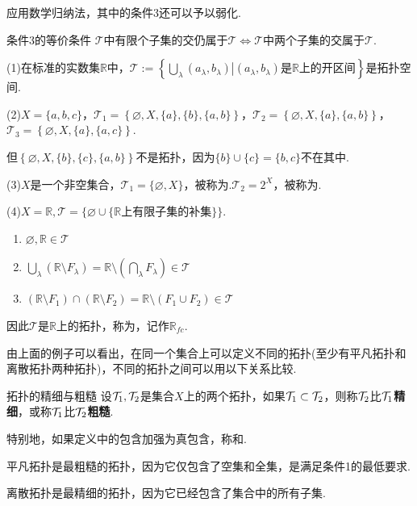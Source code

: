 应用数学归纳法，其中的条件3还可以予以弱化.
\begin{proposition}{条件3的等价条件}
    $\mathcal{T}$中有限个子集的交仍属于$\mathcal{T} \Leftrightarrow \mathcal{T}$中两个子集的交属于$\mathcal{T}$.
\end{proposition}

\begin{instance}
    (1)在标准的实数集$\mathbb{R}$中，$\mathcal{T}:=\left\{\bigcup_\lambda{(a_\lambda,b_\lambda)}\left|(a_\lambda,b_\lambda)\text{是}\mathbb{R}\text{上的开区间}\right.\right\}$是拓扑空间.\par
    (2)$X=\{a,b,c\}$，$\mathcal{T}_1 = \left\{\varnothing,X,\{a\},\{b\},\{a,b\}\right\}$，$\mathcal{T}_2 = \left\{\varnothing,X,\{a\},\{a,b\}\right\}$，$\mathcal{T}_3 = \left\{\varnothing,X,\{a\},\{a,c\}\right\}$.\par
    但$\left\{\varnothing,X,\{b\},\{c\},\{a,b\}\right\}$不是拓扑，因为$\{b\}\cup\{c\}=\{b,c\}$不在其中.\par
    (3)$X$是一个非空集合，$\mathcal{T}_1=\{\varnothing,X\}$，被称为.$\mathcal{T}_2=2^X$，被称为.\par
    (4)$X=\mathbb{R},\mathcal{T}=\{\varnothing\cup\{\mathbb{R}\text{上有限子集的补集}\}\}$.
    \begin{enumerate}[leftmargin=4.75em,label=(\roman*)]
        \item $\varnothing,\mathbb{R} \in \mathcal{T}$
        \item $\bigcup_{\lambda}{\left(\mathbb{R}\setminus F_\lambda\right)}=\mathbb{R}\setminus\left(\bigcap_{\lambda}{F_\lambda}\right) \in \mathcal{T}$
        \item $(\mathbb{R}\setminus F_1) \cap (\mathbb{R}\setminus F_2)=\mathbb{R}\setminus\left(F_1\cup F_2\right) \in \mathcal{T}$
    \end{enumerate}
    因此$\mathcal{T}$是$\mathbb{R}$上的拓扑，称为，记作$\mathbb{R}_{fc}$.
\end{instance}

由上面的例子可以看出，在同一个集合上可以定义不同的拓扑(至少有平凡拓扑和离散拓扑两种拓扑)，不同的拓扑之间可以用以下关系比较.

\begin{definition}{拓扑的精细与粗糙}
    设$\mathcal{T}_1,\mathcal{T}_2$是集合$X$上的两个拓扑，如果$\mathcal{T}_1\subset \mathcal{T}_2$，则称$\mathcal{T}_2$比$\mathcal{T}_1$\textbf{精细}，或称$\mathcal{T}_1$比$\mathcal{T}_2$\textbf{粗糙}.
\end{definition}
特别地，如果定义中的包含加强为真包含，称和.
\begin{conclusion}
    平凡拓扑是最粗糙的拓扑，因为它仅包含了空集和全集，是满足条件1的最低要求.\par
    离散拓扑是最精细的拓扑，因为它已经包含了集合中的所有子集.\par
\end{conclusion}

